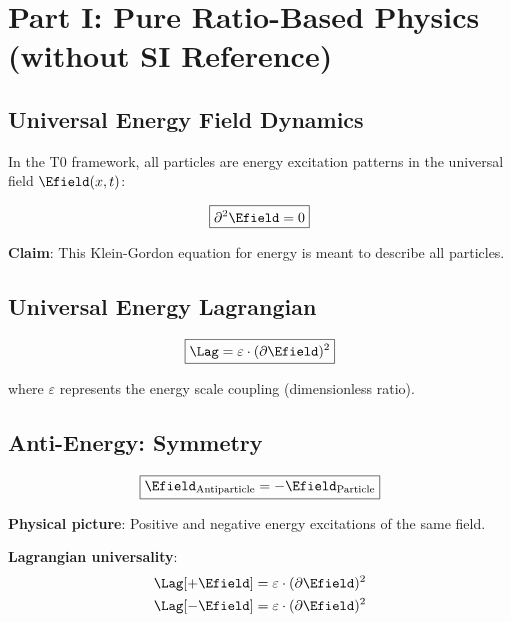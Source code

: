 	\section{Part I: Pure Ratio-Based Physics (without SI Reference)}
	
	\subsection{Universal Energy Field Dynamics}
	
	In the T0 framework, all particles are energy excitation patterns in the universal field $\Efield(x,t)$:
	
	\begin{equation}
		\boxed{\partial^2 \Efield = 0}
		\label{eq:universal_field_equation}
	\end{equation}
	
	\textbf{Claim}: This Klein-Gordon equation for energy is meant to describe all particles.
	
	\subsection{Universal Energy Lagrangian}
	
	\begin{equation}
		\boxed{\Lag = \varepsilon \cdot (\partial \Efield)^2}
		\label{eq:universal_lagrangian}
	\end{equation}
	
	where $\varepsilon$ represents the energy scale coupling (dimensionless ratio).
	
	\subsection{Anti-Energy: Symmetry}
	
	\begin{equation}
		\boxed{\Efield_{\text{Antiparticle}} = -\Efield_{\text{Particle}}}
		\label{eq:energy_antisymmetry}
	\end{equation}
	
	\textbf{Physical picture}: Positive and negative energy excitations of the same field.
	
	\textbf{Lagrangian universality}:
	\begin{align}
		\Lag[+\Efield] &= \varepsilon \cdot (\partial \Efield)^2 \\
		\Lag[-\Efield] &= \varepsilon \cdot (\partial \Efield)^2
	\end{align}
	
